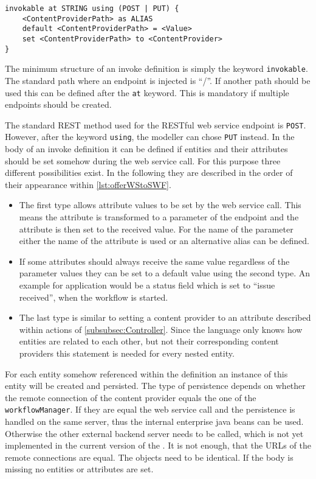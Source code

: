 \begin{lstlisting}[language=MD2, label=lst:offerWStoSWF, caption=Offer a Web Service to Start a Workflow]
invokable at STRING using (POST | PUT) {
	<ContentProviderPath> as ALIAS
	default <ContentProviderPath> = <Value>
	set <ContentProviderPath> to <ContentProvider>
}
\end{lstlisting}
The minimum structure of an invoke definition is simply the keyword \lstinline|invokable|. The standard path where an endpoint is injected is \enquote{/}. If another path should be used this can be defined after the \lstinline|at| keyword. This is mandatory if multiple endpoints should be created.

The standard REST method used for the RESTful web service endpoint is \lstinline|POST|. However, after the keyword \lstinline|using|, the modeller can chose \lstinline|PUT| instead.
In the body of an invoke definition it can be defined if entities and their attributes should be set somehow during the web service call. For this purpose three different possibilities exist. In the following they are described in the order of their appearance within \cref{lst:offerWStoSWF}.
\begin{itemize}
	\item The first type allows attribute values to be set by the web service call. This means the attribute is transformed to a parameter of the endpoint and the attribute is then set to the received value. For the name of the parameter either the name of the attribute is used or an alternative alias can be defined.
	\item If some attributes should always receive the same value regardless of the parameter values they can be set to a default value using the second type. An example for application would be a status field which is set to \enquote{issue received}, when the workflow is started.
	\item The last type is similar to setting a content provider to an attribute described within actions of \cref{subsubsec:Controller}. Since the language only knows how entities are related to each other, but not their corresponding content providers this statement is needed for every nested entity.
\end{itemize}
For each entity somehow referenced within the definition an instance of this entity will be created and persisted. The type of persistence depends on whether the remote connection of the content provider equals the one of the \lstinline|workflowManager|. If they are equal the web service call and the persistence is handled on the same server, thus the internal enterprise java beans can be used. Otherwise the other external backend server needs to be called, which is not yet implemented in the current version of the \MD. It is not enough, that the URLs of the remote connections are equal. The objects need to be identical.
If the body is missing no entities or attributes are set.